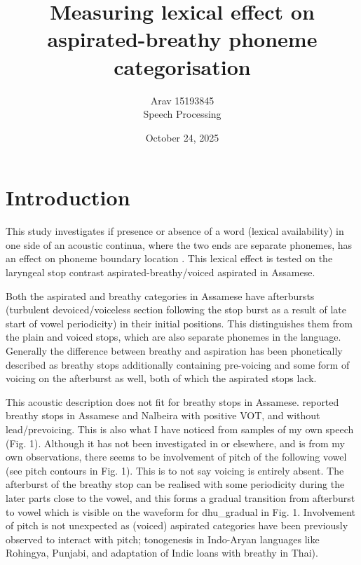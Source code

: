 \documentclass[12pt, english]{article}
\title{\vspace{-50pt}\textbf{Measuring lexical effect on aspirated-breathy phoneme categorisation}\hfill}
\author{Arav 15193845 \\ Speech Processing}
\date{October 24, 2025}
\begin{document}

\maketitle
\thispagestyle{empty}
\vspace{10pt}



\section*{Introduction}

This study investigates if presence or absence of a word (lexical availability) in one side of an acoustic continua, where the two ends are separate phonemes, has an effect on phoneme boundary location \cite{ganong1980phonetic}. This lexical effect is tested on the laryngeal stop contrast aspirated-breathy/voiced aspirated in Assamese. \\ \par

Both the aspirated and breathy categories in Assamese have afterbursts (turbulent devoiced/voiceless section following the stop burst as a result of late start of vowel periodicity) in their initial positions. This distinguishes them from the plain and voiced stops, which are also separate phonemes in the language. Generally the difference between breathy and aspiration has been phonetically described as breathy stops additionally containing pre-voicing and some form of voicing on the afterburst as well, both of which the aspirated stops lack. \\ \par

This acoustic description does not fit for breathy stops in Assamese. \cite{nath2014preliminary} reported breathy stops in Assamese and Nalbeira with positive VOT, and without lead/prevoicing. This is also what I have noticed from samples of my own speech (Fig. 1). Although it has not been investigated in \cite{nath2014preliminary} or elsewhere, and is from my own observations, there seems to be involvement of pitch of the following vowel (see pitch contours in Fig. 1). This is to not say voicing is entirely absent. The afterburst of the breathy stop can be realised with some periodicity during the later parts close to the vowel, and this forms a gradual transition from afterburst to vowel which is visible on the waveform for dhu\_gradual in Fig. 1. Involvement of pitch is not unexpected as (voiced) aspirated categories have been previously observed to interact with pitch; tonogenesis in Indo-Aryan languages like Rohingya, Punjabi, and adaptation of Indic loans with breathy in Thai). \\ \par
\end{document}

